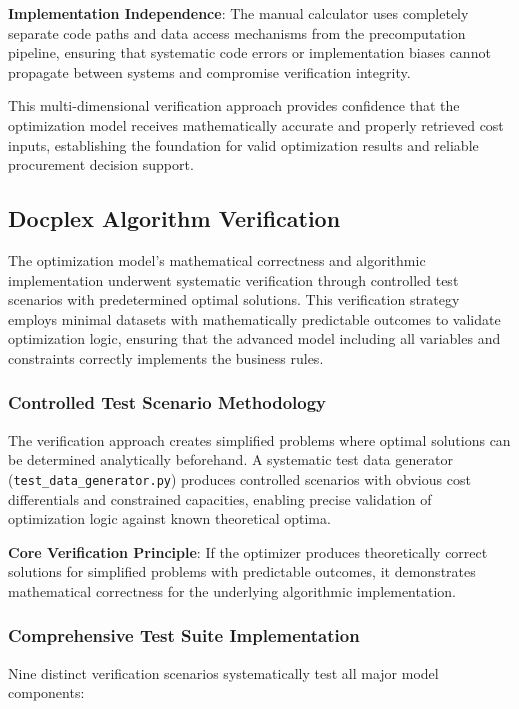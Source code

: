 \textbf{Implementation Independence}: The manual calculator uses completely separate code paths and data access mechanisms from the precomputation pipeline, ensuring that systematic code errors or implementation biases cannot propagate between systems and compromise verification integrity.

This multi-dimensional verification approach provides confidence that the optimization model receives mathematically accurate and properly retrieved cost inputs, establishing the foundation for valid optimization results and reliable procurement decision support.

\subsection{Docplex Algorithm Verification}

The optimization model's mathematical correctness and algorithmic implementation underwent systematic verification through controlled test scenarios with predetermined optimal solutions. This verification strategy employs minimal datasets with mathematically predictable outcomes to validate optimization logic, ensuring that the advanced model including all variables and constraints correctly implements the business rules.

\subsubsection{Controlled Test Scenario Methodology}

The verification approach creates simplified problems where optimal solutions can be determined analytically beforehand. A systematic test data generator (\texttt{test\_data\_generator.py}) produces controlled scenarios with obvious cost differentials and constrained capacities, enabling precise validation of optimization logic against known theoretical optima.

\textbf{Core Verification Principle}: If the optimizer produces theoretically correct solutions for simplified problems with predictable outcomes, it demonstrates mathematical correctness for the underlying algorithmic implementation.

\subsubsection{Comprehensive Test Suite Implementation}

Nine distinct verification scenarios systematically test all major model components:

